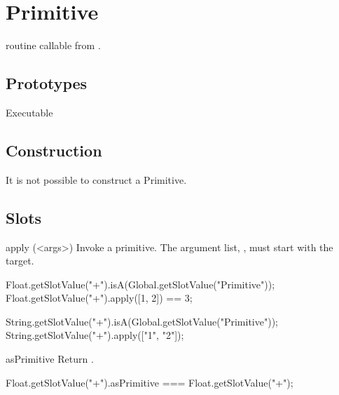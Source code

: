 
\section{Primitive}
\Cxx routine callable from \us.

\subsection{Prototypes}
\begin{refObjects}
\item[Executable]
\end{refObjects}

\subsection{Construction}

It is not possible to construct a Primitive.

\subsection{Slots}

\begin{urbiscriptapi}
\item[apply](<args>)%
  Invoke a primitive.  The argument list, , must start with
  the target.
\begin{urbiassert}
Float.getSlotValue("+").isA(Global.getSlotValue("Primitive"));
Float.getSlotValue("+").apply([1, 2]) == 3;

String.getSlotValue("+").isA(Global.getSlotValue("Primitive"));
String.getSlotValue("+").apply(["1", "2"]);
\end{urbiassert}


\item[asPrimitive] Return \this.
\begin{urbiassert}
Float.getSlotValue("+").asPrimitive === Float.getSlotValue("+");
\end{urbiassert}
\end{urbiscriptapi}


